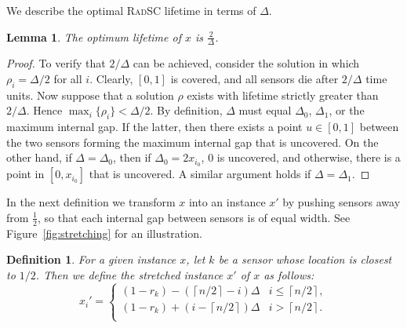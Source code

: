 \documentclass[11pt]{article}
\newtheorem{lemma}{Lemma}
\newtheorem{definition}{Definition}
\newcommand{\ceil}[1]{\left\lceil {#1} \right\rceil}
\newcommand{\half}{\frac{1}{2}}
\newcommand{\srsc}{\textsc{RadSC}\xspace}
\begin{document}
We describe the optimal \srsc lifetime in terms of $\Delta$.

\begin{lemma}
\label{lemma:unit-opt}
The optimum lifetime of $x$ is $\frac{2}{\Delta}$.
\end{lemma}
\begin{proof}
To verify that $2/\Delta$ can be achieved, consider the solution in
which $\rho_i = \Delta/2$ for all $i$.  Clearly, $[0,1]$ is covered,
and all sensors die after $2/\Delta$ time units.  Now suppose that a
solution $\rho$ exists with lifetime strictly greater than $2/\Delta$.
Hence $\max_i \{\rho_i\} < \Delta /2$.  By definition, $\Delta$ must
equal $\Delta_0$, $\Delta_1$, or the maximum internal gap.  If the
latter, then there exists a point $u \in [0,1]$ between the two
sensors forming the maximum internal gap that is uncovered. On the
other hand, if $\Delta = \Delta_0$, then if $\Delta_0 = 2x_{i_0}$, 0
is uncovered, and otherwise, there is a point in $[0,x_{i_0}]$ that is
uncovered.  A similar argument holds if $\Delta = \Delta_1$.
\end{proof}

In the next definition we transform $x$ into an instance $x'$ by
pushing sensors away from $\half$, so that each internal gap between
sensors is of equal width.
See Figure~\ref{fig:stretching} for an illustration. 

\begin{definition}
For a given instance $x$, let $k$ be a sensor whose location is
closest to $1/2$.  Then we define the \emph{stretched} instance $x'$
of $x$ as follows:
\[
x_i' = 
\begin{cases} 
(1-r_k) - (\ceil{n/2}-i) \Delta & i \leq \ceil{n/2}, \\
(1-r_k) + (i-\ceil{n/2}) \Delta & i > \ceil{n/2}. \\
\end{cases}
\] 
\end{definition}	
\end{document}

